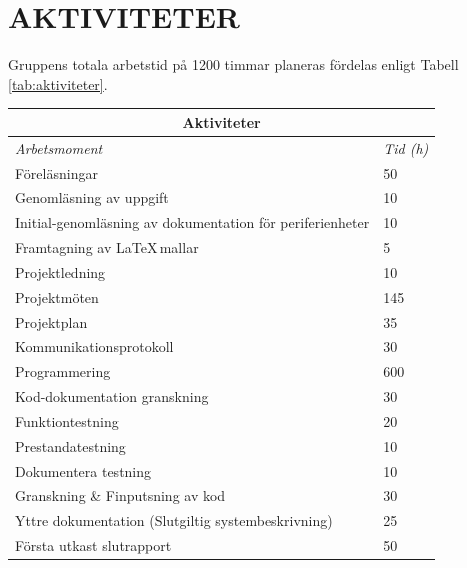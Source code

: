 \documentclass[a4paper]{article}
\begin{document}
\section{AKTIVITETER}
\label{sec:sktiviteter}
Gruppens totala arbetstid på 1200 timmar planeras fördelas enligt Tabell \ref{tab:aktiviteter}.
\newline

\begin{table}[b]
\begin{tabular}{|l|l|}
\hline
\multicolumn{2}{|c|}{\textbf{Aktiviteter}}                                   \\ \hline
\textit{Arbetsmoment}                                     & \textit{Tid (h)} \\ \hline
Föreläsningar                                             & 50               \\
Genomläsning av uppgift                                   & 10               \\
Initial-genomläsning av dokumentation för periferienheter & 10               \\
Framtagning av \LaTeX \,mallar                            & 5                \\
Projektledning                                            & 10               \\
Projektmöten                                              & 145              \\
Projektplan                                               & 35               \\
Kommunikationsprotokoll                                   & 30               \\
Programmering                                             & 600              \\
Kod-dokumentation granskning                              & 30               \\
Funktiontestning                                          & 20               \\
Prestandatestning                                         & 10               \\
Dokumentera testning                                      & 10               \\
Granskning \& Finputsning av kod                          & 30               \\
Yttre dokumentation (Slutgiltig systembeskrivning)        & 25               \\
Första utkast slutrapport                                 & 50               \\

\end{tabular}
\end{table}
\end{document}

